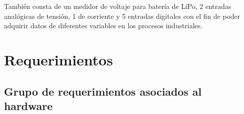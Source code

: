 También consta de un medidor de voltaje para batería de LiPo, 2 entradas analógicas de tensión, 1 de corriente y 5 entradas digitales con el fin de poder adquirir datos de diferentes variables en los procesos industriales.







\section{Requerimientos}

\subsection{Grupo de requerimientos asociados al hardware}

